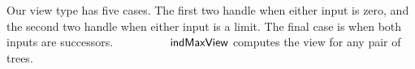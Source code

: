 \begin{code}
\>[12]\AgdaSpace{}%
%
\>[19]\AgdaSymbol{\{}\AgdaSpace{}%
\AgdaSymbol{:}\AgdaSpace{}%
\AgdaSymbol{\}}\AgdaSpace{}%
\AgdaSymbol{\{}\AgdaSpace{}%
\AgdaSymbol{:}\AgdaSpace{}%
\AgdaSpace{}%
\AgdaSpace{}%
\AgdaSpace{}%
\AgdaSymbol{\}}\AgdaSpace{}%
\AgdaSpace{}%
\AgdaSpace{}%
\AgdaSymbol{(}\AgdaSpace{}%
\AgdaSpace{}%
%
\>[62]\AgdaSpace{}%
\AgdaSymbol{))}\<%
\\
%
\>[12]\AgdaSpace{}%
\AgdaSpace{}%
\AgdaSpace{}%
\AgdaSymbol{(}\AgdaSpace{}%
\AgdaSpace{}%
\AgdaSymbol{)}\<%
\\
%
\>[10]\AgdaSpace{}%
\AgdaSymbol{:}\AgdaSpace{}%
%
\>[29]\AgdaSymbol{\{}\AgdaSpace{}%
\AgdaSpace{}%
\AgdaSymbol{\}}\AgdaSpace{}%
\AgdaSpace{}%
\AgdaSpace{}%
\AgdaSymbol{(}\AgdaSpace{}%
\AgdaSymbol{)}\AgdaSpace{}%
\AgdaSymbol{(}\AgdaSpace{}%
\AgdaSymbol{)}\<%
\\
%
\>[4]\<%
\\
%
\\[\AgdaEmptyExtraSkip]%
\>[4][@{}l@{\AgdaIndent{0}}]%
\>[8]\AgdaSpace{}%
\AgdaSymbol{:}\AgdaSpace{}%
\AgdaSpace{}%
\AgdaSpace{}%
\AgdaSpace{}%
\AgdaSpace{}%
\AgdaSpace{}%
\AgdaSpace{}%
\<%
\end{code}
Our view type has five cases. The first two handle when either input
is zero, and the second two handle when either input is a limit.
The final case is when both inputs are successors.
$\AgdaFunction{indMaxView}$ computes the view for any pair of trees.

